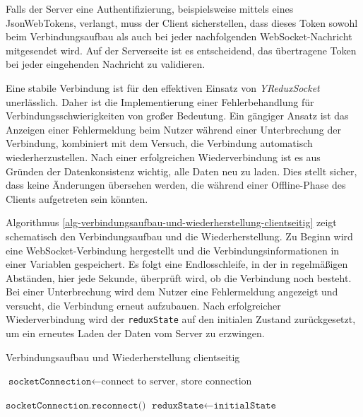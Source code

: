 \documentclass[12pt]{book}          %
\begin{document}
Falls der Server eine Authentifizierung, beispielsweise mittels eines JsonWebTokens, verlangt, muss der Client sicherstellen, dass dieses Token sowohl beim Verbindungsaufbau als auch bei jeder nachfolgenden WebSocket-Nachricht mitgesendet wird. Auf der Serverseite ist es entscheidend, das übertragene Token bei jeder eingehenden Nachricht zu validieren.

Eine stabile Verbindung ist für den effektiven Einsatz von \textit{YReduxSocket} unerlässlich. Daher ist die Implementierung einer Fehlerbehandlung für Verbindungsschwierigkeiten von großer Bedeutung. Ein gängiger Ansatz ist das Anzeigen einer Fehlermeldung beim Nutzer während einer Unterbrechung der Verbindung, kombiniert mit dem Versuch, die Verbindung automatisch wiederherzustellen. Nach einer erfolgreichen Wiederverbindung ist es aus Gründen der Datenkonsistenz wichtig, alle Daten neu zu laden. Dies stellt sicher, dass keine Änderungen übersehen werden, die während einer Offline-Phase des Clients aufgetreten sein könnten.

Algorithmus \ref{alg-verbindungsaufbau-und-wiederherstellung-clientseitig} zeigt schematisch den Verbindungsaufbau und die Wiederherstellung. Zu Beginn wird eine WebSocket-Verbindung hergestellt und die Verbindungsinformationen in einer Variablen gespeichert. Es folgt eine Endlosschleife, in der in regelmäßigen Abständen, hier jede Sekunde, überprüft wird, ob die Verbindung noch besteht. Bei einer Unterbrechung wird dem Nutzer eine Fehlermeldung angezeigt und versucht, die Verbindung erneut aufzubauen. Nach erfolgreicher Wiederverbindung wird der \texttt{reduxState} auf den initialen Zustand zurückgesetzt, um ein erneutes Laden der Daten vom Server zu erzwingen.

\begin{algorithm}
\caption{Verbindungsaufbau und Wiederherstellung clientseitig}
\label{alg-verbindungsaufbau-und-wiederherstellung-clientseitig}
\begin{algorithmic}
    \State $\texttt{socketConnection} \gets \text{connect to server, store connection}$

            \State {}
            \State $\texttt{socketConnection.reconnect()}$
                \State $\texttt{reduxState} \gets \texttt{initialState}$ 
                \State {}
            \EndIf
        \EndIf
        \State {}
    \EndWhile
\end{algorithmic}
\end{algorithm}
\end{document}
